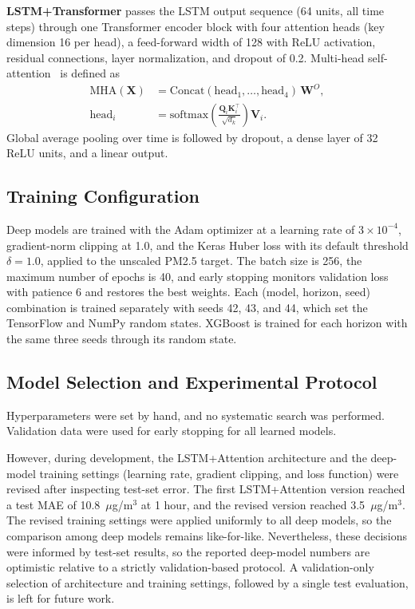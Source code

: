\documentclass[conference]{IEEEtran}
\begin{document}
\textbf{LSTM+Transformer} passes the LSTM output sequence (64 units, all time steps) through one Transformer encoder block with four attention heads (key dimension 16 per head), a feed-forward width of 128 with ReLU activation, residual connections, layer normalization, and dropout of 0.2. Multi-head self-attention~\cite{vaswani2017} is defined as
\begin{equation}
\begin{aligned}
\mathrm{MHA}(\mathbf{X}) &= \mathrm{Concat}(\mathrm{head}_1,\dots,\mathrm{head}_4)\,\mathbf{W}^O,\\
\mathrm{head}_i &= \mathrm{softmax}\!\left(\frac{\mathbf{Q}_i\mathbf{K}_i^\top}{\sqrt{d_k}}\right)\mathbf{V}_i.
\end{aligned}
\end{equation}
Global average pooling over time is followed by dropout, a dense layer of 32 ReLU units, and a linear output.

\subsection{Training Configuration}
Deep models are trained with the Adam optimizer at a learning rate of \(3\times10^{-4}\), gradient-norm clipping at 1.0, and the Keras Huber loss with its default threshold \(\delta=1.0\), applied to the unscaled PM2.5 target. The batch size is 256, the maximum number of epochs is 40, and early stopping monitors validation loss with patience 6 and restores the best weights. Each (model, horizon, seed) combination is trained separately with seeds 42, 43, and 44, which set the TensorFlow and NumPy random states. XGBoost is trained for each horizon with the same three seeds through its random state.

\subsection{Model Selection and Experimental Protocol}
Hyperparameters were set by hand, and no systematic search was performed. Validation data were used for early stopping for all learned models.

However, during development, the LSTM+Attention architecture and the deep-model training settings (learning rate, gradient clipping, and loss function) were revised after inspecting test-set error. The first LSTM+Attention version reached a test MAE of 10.8~\(\mu\)g/m\(^3\) at 1 hour, and the revised version reached 3.5~\(\mu\)g/m\(^3\). The revised training settings were applied uniformly to all deep models, so the comparison among deep models remains like-for-like. Nevertheless, these decisions were informed by test-set results, so the reported deep-model numbers are optimistic relative to a strictly validation-based protocol. A validation-only selection of architecture and training settings, followed by a single test evaluation, is left for future work.
\end{document}
